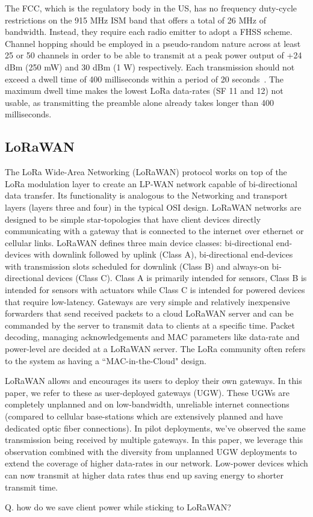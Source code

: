 The \ac{FCC}, which is the regulatory body in the \ac{US}, has no frequency duty-cycle restrictions on the 915 MHz \ac{ISM} band that offers a total of 26 MHz of bandwidth.
Instead, they require each radio emitter to adopt a \ac{FHSS} scheme.
Channel hopping should be employed in a pseudo-random nature across at least 25 or 50 channels in order to be able to transmit at a peak power output of +24 dBm (250 mW) and 30 dBm (1 W) respectively.
Each transmission should not exceed a dwell time of 400 milliseconds within a period of 20 seconds~\cite{FCC15, FCCCompliance}.
The maximum dwell time makes the lowest \ac{LoRa} data-rates (\ac{SF} 11 and 12) not usable, as transmitting the preamble alone already takes longer than 400 milliseconds.

\subsection{LoRaWAN}
\label{sec:lorawan}

The LoRa Wide-Area Networking (LoRaWAN) protocol works on top of the LoRa
modulation layer to create an LP-WAN network capable of bi-directional data
transfer. Its functionality is analogous to the Networking and transport
layers (layers three and four) in the typical OSI design. LoRaWAN networks
are designed to be simple star-topologies that have client devices directly
communicating with a gateway that is connected to the internet over ethernet
or cellular links. LoRaWAN defines three main device classes: bi-directional
end-devices with downlink followed by uplink (Class A), bi-directional
end-devices with transmission slots scheduled for downlink (Class B) and
always-on bi-directional devices (Class C). Class A is primarily intended for
sensors, Class B is intended for sensors with actuators while Class C is
intended for powered devices that require low-latency. Gateways are very
simple and relatively inexpensive forwarders that send received packets to a
cloud LoRaWAN server and can be commanded by the server to transmit data to
clients at a specific time. Packet decoding, managing acknowledgements and
MAC parameters like data-rate and power-level are decided at a LoRaWAN
server. The LoRa community often refers to the system as having a
``MAC-in-the-Cloud" design.

LoRaWAN allows and encourages its users to deploy their own gateways. In this
paper, we refer to these as user-deployed gateways (UGW). These UGWs are
completely unplanned and on low-bandwidth, unreliable internet connections
(compared to cellular base-stations which are extensively planned and have
dedicated optic fiber connections). In pilot deployments, we've observed the
same transmission being received by multiple gateways. In this paper, we
leverage this observation combined with the diversity from unplanned UGW
deployments to extend the coverage of higher data-rates in our network.
Low-power devices which can now transmit at higher data rates thus end up
saving energy to shorter transmit time.

{\color{blue}

Q. how do we save client power while sticking to LoRaWAN?
}